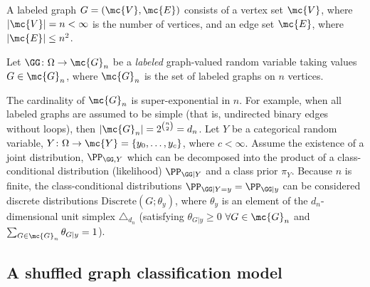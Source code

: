 \documentclass[10pt,journal,cspaper,compsoc]{IEEEtran}
\begin{document}
A labeled graph $G=(\mc{V},\mc{E})$ consists of a vertex set $\mc{V}$, where $|\mc{V}|=n < \infty$ is the number of vertices, and an edge set $\mc{E}$, where $|\mc{E}| \leq n^2$.
\begin{defi}
Let $\GG\colon \Omega \to \mc{G}_n$ be a \emph{labeled} graph-valued random variable taking values $G\in \mc{G}_n$, where $\mc{G}_n$ is the set of labeled graphs on $n$ vertices.	
\end{defi}
The cardinality of $\mc{G}_n$ is super-exponential in $n$.  For example, when all labeled graphs are assumed to be simple (that is, undirected binary edges without loops), then $|\mc{G}_n|=2^{\binom{n}{2}}=d_n$. 
Let $Y$ be a categorical random variable, $Y\colon \Omega \to \mc{Y}=\{y_0,\ldots, y_{c}\}$, where $c< \infty$.  Assume the existence of a joint distribution, $\PP_{\GG,Y}$ which can be decomposed into the product of a class-conditional distribution (likelihood) $\PP_{\GG|Y}$ and a class prior $\pi_Y$. Because $n$ is finite, the class-conditional  distributions $\PP_{\GG | Y=y}=\PP_{\GG|y}$ can be considered discrete distributions $\text{Discrete}(G; \theta_y)$, where $\theta_y$ is an element of the $d_n$-dimensional unit simplex $\triangle_{d_n}$ (satisfying $\theta_{G|y}\geq 0$ $\forall G \in \mc{G}_n$ and $\sum_{G \in \mc{G}_n} \theta_{G|y}=1$).



\subsection{A shuffled graph classification model} %
\label{sub:a_shuffled_graph_classification_model}


\end{document}
